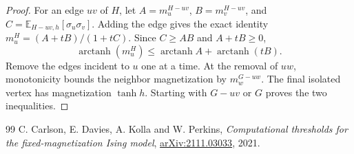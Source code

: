 \documentclass[10pt,a4paper]{amsart}
\newcommand{\E}{\mathbb E}
\newcommand{\arctanh}{\operatorname{arctanh}}
\begin{document}
\begin{proof}
For an edge $uv$ of $H$, let
$A=m_u^{H-uv}$, $B=m_v^{H-uv}$, and
$C=\E_{H-uv,h}[\sigma_u\sigma_v]$.
Adding the edge gives the exact identity
$m_u^H=(A+tB)/(1+tC)$.
Since $C\ge AB$ and $A+tB\ge0$,
\[
 \arctanh(m_u^H)\le\arctanh A+\arctanh(tB).
\]
Remove the edges incident to $u$ one at a time.
At the removal of $uw$, monotonicity bounds the neighbor
magnetization by $m_w^{G-uw}$.
The final isolated vertex has magnetization $\tanh h$.
Starting with $G-uv$ or $G$ proves the two inequalities.
\end{proof}

\begin{thebibliography}{99}
 C. Carlson, E. Davies, A. Kolla and W. Perkins, \emph{Computational thresholds for the fixed-magnetization Ising model}, \href{https://arxiv.org/abs/2111.03033}{arXiv:2111.03033}, 2021.
\end{thebibliography}
\end{document}
